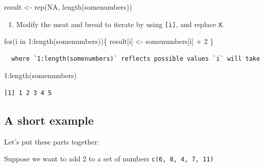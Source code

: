 \documentclass[
  letterpaper,
  DIV=11,
  numbers=noendperiod]{scrreprt}
\newenvironment{Shaded}{\begin{snugshade}}{\end{snugshade}}
\newcommand{\ConstantTok}[1]{\textcolor[rgb]{0.56,0.35,0.01}{#1}}
\newcommand{\ControlFlowTok}[1]{\textcolor[rgb]{0.00,0.23,0.31}{#1}}
\newcommand{\DecValTok}[1]{\textcolor[rgb]{0.68,0.00,0.00}{#1}}
\newcommand{\FunctionTok}[1]{\textcolor[rgb]{0.28,0.35,0.67}{#1}}
\newcommand{\NormalTok}[1]{\textcolor[rgb]{0.00,0.23,0.31}{#1}}
\newcommand{\OtherTok}[1]{\textcolor[rgb]{0.00,0.23,0.31}{#1}}
\newcommand{\SpecialCharTok}[1]{\textcolor[rgb]{0.37,0.37,0.37}{#1}}
\providecommand{\tightlist}{%
  \setlength{\itemsep}{0pt}\setlength{\parskip}{0pt}}\usepackage{longtable,booktabs,array}
\begin{document}
\begin{Shaded}
\begin{Highlighting}[]
\NormalTok{result }\OtherTok{\textless{}{-}} \FunctionTok{rep}\NormalTok{(}\ConstantTok{NA}\NormalTok{, }\FunctionTok{length}\NormalTok{(somenumbers))}
\end{Highlighting}
\end{Shaded}

\begin{enumerate}
\def\labelenumi{\arabic{enumi}.}
\setcounter{enumi}{4}
\tightlist
\item
  Modify the meat and bread to iterate by using \texttt{{[}i{]}}, and
  replace \texttt{X}.
\end{enumerate}

\begin{Shaded}
\begin{Highlighting}[]
\ControlFlowTok{for}\NormalTok{(i }\ControlFlowTok{in} \DecValTok{1}\SpecialCharTok{:}\FunctionTok{length}\NormalTok{(somenumbers))\{}
\NormalTok{  result[i] }\OtherTok{\textless{}{-}}\NormalTok{ somenumbers[i] }\SpecialCharTok{+} \DecValTok{2}
\NormalTok{\}}
\end{Highlighting}
\end{Shaded}

\begin{verbatim}
  where `1:length(somenumbers)` reflects possible values `i` will take 
\end{verbatim}

\begin{Shaded}
\begin{Highlighting}[]
\DecValTok{1}\SpecialCharTok{:}\FunctionTok{length}\NormalTok{(somenumbers)}
\end{Highlighting}
\end{Shaded}

\begin{verbatim}
[1] 1 2 3 4 5
\end{verbatim}

\hypertarget{a-short-example}{%
\subsection{A short example}\label{a-short-example}}

Let's put these parts together:

Suppose we want to add 2 to a set of numbers
\texttt{c(6,\ 8,\ 4,\ 7,\ 11)}
\end{document}
